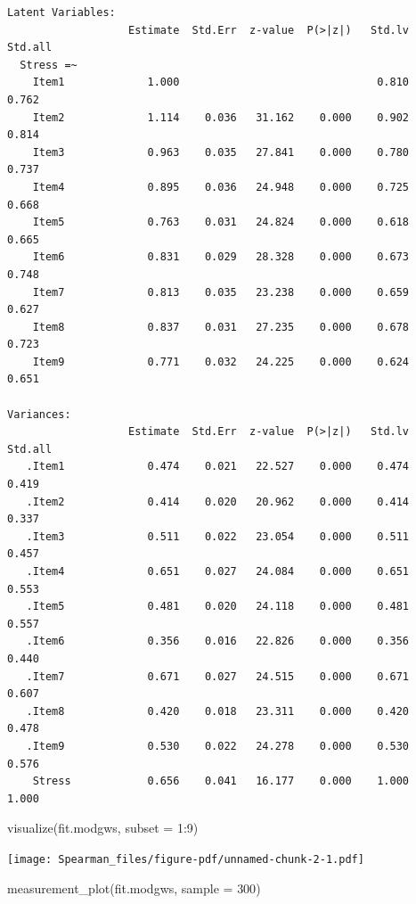 \documentclass[
  letterpaper,
  DIV=11,
  numbers=noendperiod]{scrreprt}
\newenvironment{Shaded}{\begin{snugshade}}{\end{snugshade}}
\newcommand{\AttributeTok}[1]{\textcolor[rgb]{0.40,0.45,0.13}{#1}}
\newcommand{\DecValTok}[1]{\textcolor[rgb]{0.68,0.00,0.00}{#1}}
\newcommand{\FunctionTok}[1]{\textcolor[rgb]{0.28,0.35,0.67}{#1}}
\newcommand{\NormalTok}[1]{\textcolor[rgb]{0.00,0.23,0.31}{#1}}
\newcommand{\SpecialCharTok}[1]{\textcolor[rgb]{0.37,0.37,0.37}{#1}}
\begin{document}
\begin{verbatim}
Latent Variables:
                   Estimate  Std.Err  z-value  P(>|z|)   Std.lv  Std.all
  Stress =~                                                             
    Item1             1.000                               0.810    0.762
    Item2             1.114    0.036   31.162    0.000    0.902    0.814
    Item3             0.963    0.035   27.841    0.000    0.780    0.737
    Item4             0.895    0.036   24.948    0.000    0.725    0.668
    Item5             0.763    0.031   24.824    0.000    0.618    0.665
    Item6             0.831    0.029   28.328    0.000    0.673    0.748
    Item7             0.813    0.035   23.238    0.000    0.659    0.627
    Item8             0.837    0.031   27.235    0.000    0.678    0.723
    Item9             0.771    0.032   24.225    0.000    0.624    0.651

Variances:
                   Estimate  Std.Err  z-value  P(>|z|)   Std.lv  Std.all
   .Item1             0.474    0.021   22.527    0.000    0.474    0.419
   .Item2             0.414    0.020   20.962    0.000    0.414    0.337
   .Item3             0.511    0.022   23.054    0.000    0.511    0.457
   .Item4             0.651    0.027   24.084    0.000    0.651    0.553
   .Item5             0.481    0.020   24.118    0.000    0.481    0.557
   .Item6             0.356    0.016   22.826    0.000    0.356    0.440
   .Item7             0.671    0.027   24.515    0.000    0.671    0.607
   .Item8             0.420    0.018   23.311    0.000    0.420    0.478
   .Item9             0.530    0.022   24.278    0.000    0.530    0.576
    Stress            0.656    0.041   16.177    0.000    1.000    1.000
\end{verbatim}

\begin{Shaded}
\begin{Highlighting}[]
\FunctionTok{visualize}\NormalTok{(fit.modgws, }\AttributeTok{subset =} \DecValTok{1}\SpecialCharTok{:}\DecValTok{9}\NormalTok{)}
\end{Highlighting}
\end{Shaded}

\texttt{[image: Spearman\_files/figure-pdf/unnamed-chunk-2-1.pdf]}

\begin{Shaded}
\begin{Highlighting}[]
\FunctionTok{measurement\_plot}\NormalTok{(fit.modgws, }\AttributeTok{sample =} \DecValTok{300}\NormalTok{)}
\end{Highlighting}
\end{Shaded}
\end{document}
